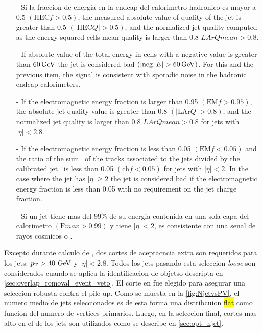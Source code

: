 \begin{itemize}\itemsep0.1cm
\item[-] Si la fraccion de energia en la endcap del calorimetro hadronico
  es mayor a 0.5 $\left(\mathrm{HEC}f > 0.5\right)$, the measured absolute
  value of quality of the jet is greater than 0.5 $\left(|\mathrm{HEC}Q| > 0.5\right)$,
  and the normalized jet quality computed as the energy squared cells mean
  quality is larger than 0.8 $LArQmean > 0.8$.
\item[-] If absolute value of the total energy in cells with a negative value
  is greater than $\unit[60]{GeV}$ the jet is considered bad
  $\left(|\mathrm{neg.}\,E| > \unit[60]{GeV}\right)$.
  For this and the previous item, the signal is consistent with sporadic
  noise in the hadronic endcap calorimeters.
\item[-] If the electromagnetic energy fraction is larger than 0.95
  $\left(\mathrm{EM}f > 0.95\right)$, the absolute jet quality value is greater than
  0.8 $\left(|\mathrm{LAr}Q| > 0.8\right)$, and the normalized jet quality is larger than 0.8
 $LArQmean > 0.8$ for jets with $|\eta| < 2.8$.
\item[-] If the electromagnetic energy fraction is less than 0.05
  $\left(\mathrm{EM}f < 0.05\right)$ and the ratio of the sum \pt\ of the
  tracks associated to the jets divided by the calibrated jet \pt\ is less than 0.05
  $\left(\mathrm{ch}f < 0.05\right)$ for jets with $|\eta| < 2$.
  In the case where the jet has $|\eta| \ge 2$ the jet is considered bad if
  the electromagnetic energy fraction is less than 0.05 with no requirement on
  the jet charge fraction.
\item[-] Si un jet tiene mas del $99\%$ de su energia contenida en una sola capa
  del calorimetro $(\mathrm{F}max > 0.99)$ y tiene $|\eta| < 2$, es consistente
  con una senal de rayos cosmicos o .
\end{itemize}

Excepto durante calculo de {\met}, dos cortes de aceptacncia extra son requeridos
para los jets: $\pt > 40 \gev$ y $|\eta| < 2.8$.
Todos los jets pasando esta seleccion \emph{loose} son considerados cuando se aplica
la identificacion de objetso descripta en {\Sec} \ref{sec:overlap_romoval_event_veto}.
El corte en {\pt} fue elegido para asegurar una seleccion robusta contra el pile-up.
Como se muesta en la {\fig} \ref{fig:NjetvsPV}, el numero medio de jets seleccionados
es de esta forma una distribcuion \hl{flat} como funcion del numero de vertices
primarios. Luego, en la seleccion final, cortes mas alto en el {\pt} de los jets
son utilizados como se describe en {\Sec} \ref{sec:opt_njet}.

